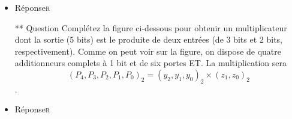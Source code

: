 \documentclass[11pt]{article}
\begin{document}
\begin{itemize}
\item Réponse\hfill{}\textsc{r}
\label{sec:org547ca10}

  ** Question
Complétez la figure ci-dessous pour obtenir un multiplicateur dont
  la sortie (5 bits) est le produite de deux entrées (de 3 bits et 2
  bits, respectivement). Comme on peut voir sur la figure, on dispose
  de quatre additionneurs complets à 1 bit et de six portes ET. La
  multiplication sera $$(P_4, P_3, P_2, P_1, P_0)_2 = (y_2, y_1, y_0)_2
    \times (z_1, z_0)_2$$.
  \begin{center}

\end{center}

\item Réponse\hfill{}\textsc{r}
\label{sec:orgb67fb6f}
\end{itemize}
\end{document}

